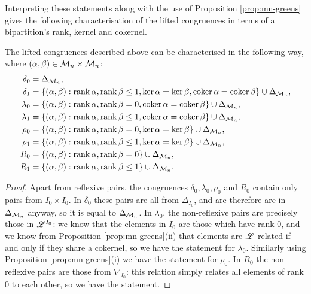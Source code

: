 Interpreting these statements along with the use of Proposition
\ref{prop:mn-greens} gives the following characterisation of the lifted
congruences in terms of a bipartition's rank, kernel and cokernel.

\begin{proposition}
  \label{prop:mn-cong-char}
  The lifted congruences described above can be characterised in the following way,
  where $(\alpha, \beta) \in \mathcal{M}_n \times \mathcal{M}_n$:
  \begin{align*}
    \delta_0 &= \Delta_{\mathcal{M}_n}, \\
    \delta_1 &= \{(\alpha,\beta) :
                  \operatorname{rank}\alpha,\operatorname{rank}\beta \leq 1,
                  \ker\alpha = \ker\beta,
                  \operatorname{coker}\alpha = \operatorname{coker}\beta\} \cup \Delta_{\mathcal{M}_n}, \\
    \lambda_0 &= \{(\alpha,\beta) :
                   \operatorname{rank}\alpha,\operatorname{rank}\beta = 0,
                   \operatorname{coker}\alpha = \operatorname{coker}\beta\} \cup \Delta_{\mathcal{M}_n}, \\
    \lambda_1 &= \{(\alpha,\beta) :
                   \operatorname{rank}\alpha,\operatorname{rank}\beta \leq 1,
                   \operatorname{coker}\alpha = \operatorname{coker}\beta\} \cup \Delta_{\mathcal{M}_n}, \\
    \rho_0 &= \{(\alpha,\beta) :
                \operatorname{rank}\alpha,\operatorname{rank}\beta = 0,
                \ker\alpha = \ker\beta\} \cup \Delta_{\mathcal{M}_n}, \\
    \rho_1 &= \{(\alpha,\beta) :
                \operatorname{rank}\alpha,\operatorname{rank}\beta \leq 1,
                \ker\alpha = \ker\beta\} \cup \Delta_{\mathcal{M}_n}, \\
    R_0 &= \{(\alpha,\beta) :
             \operatorname{rank}\alpha,\operatorname{rank}\beta = 0\} \cup \Delta_{\mathcal{M}_n}, \\
    R_1 &= \{(\alpha,\beta) :
             \operatorname{rank}\alpha,\operatorname{rank}\beta \leq 1\} \cup \Delta_{\mathcal{M}_n}.
  \end{align*}
  \begin{proof}
    Apart from reflexive pairs, the congruences $\delta_0, \lambda_0, \rho_0$
    and $R_0$ contain only pairs from $I_0 \times I_0$.  In $\delta_0$ these
    pairs are all from $\Delta_{I_0}$, and are therefore are in
    $\Delta_{\mathcal{M}_n}$ anyway, so it is equal to $\Delta_{\mathcal{M}_n}$.  In
    $\lambda_0$, the non-reflexive pairs are precisely those in $\mathscr{L}^{I_0}$: we
    know that the elements in $I_0$ are those which have rank $0$, and we know
    from Proposition \ref{prop:mn-greens}(ii) that elements are $\mathscr{L}$-related if
    and only if they share a cokernel, so we have the statement for $\lambda_0$.
    Similarly using Proposition \ref{prop:mn-greens}(i) we have the statement
    for $\rho_0$.  In $R_0$ the non-reflexive pairs are those from
    $\nabla_{I_0}$: this relation simply relates all elements of rank $0$ to
    each other, so we have the statement.


\end{proof}
\end{proposition}
